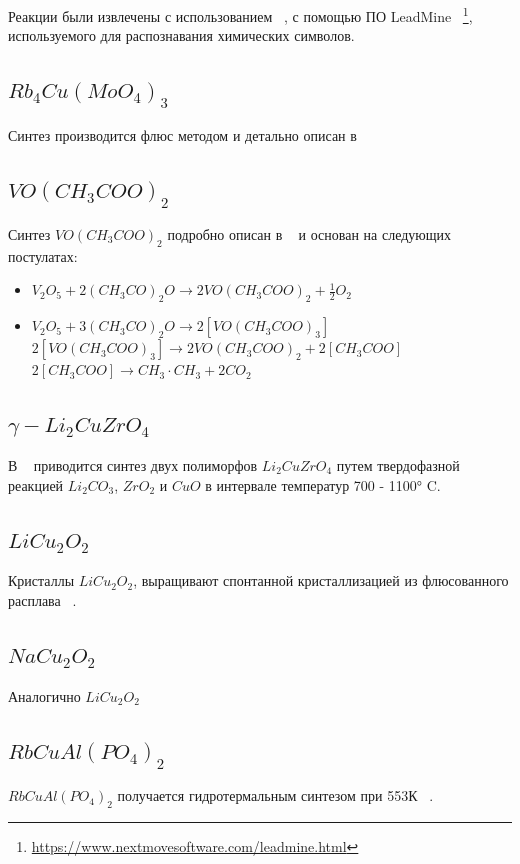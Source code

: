 \documentclass[11pt]{article}
\begin{document}
Реакции были извлечены с использованием ~\cite{extraction_cml, extraction_cml_1, extraction_cml_2, extraction_cml_3}, с помощью ПО LeadMine ~\footnote{\url{https://www.nextmovesoftware.com/leadmine.html}}, используемого для распознавания химических символов.

\subsection{$Rb_4Cu(MoO_4)_3$}
Синтез производится флюс методом и детально описан в ~\cite{lsu}

\subsection{$VO(CH_3COO)_2$}
Синтез $VO(CH_3COO)_2$ подробно описан в ~\cite{paul2007} и основан на следующих постулатах:

\begin{itemize} 
\item $V_2O_5+2(CH_3CO)_2O \rightarrow 2VO(CH_3COO)_2+\frac{1}{2}O_2$
\item $V_2O_5+3(CH_3CO)_2O \rightarrow 2[VO(CH_3COO)_3]$ \\
$2[VO(CH_3COO)_3] \rightarrow 2VO(CH_3COO)_2 + 2[CH_3COO]$ \\
$2[CH_3COO] \rightarrow CH_3 \cdot CH_3 +2CO_2 $ \\
\end{itemize} 


\subsection{$\gamma-Li_2CuZrO_4$}
В ~\cite{dussarrat2002} приводится синтез двух полиморфов $Li_2CuZrO_4$ путем твердофазной  реакцией $Li_2CO_3$, $ZrO_2$ и $CuO$ в интервале температур 700 - 1100° C.

\subsection{$LiCu_2O_2$}
Кристаллы $LiCu_2O_2$, выращивают спонтанной кристаллизацией из флюсованного расплава ~\cite{paszkowicz2001}.


\subsection{$NaCu_2O_2$}
Аналогично $LiCu_2O_2$

\subsection{$RbCuAl(PO_4)_2$}
$RbCuAl(PO_4)_2$ получается гидротермальным синтезом при 553К ~\cite{yakubovich2016}.
\end{document}
